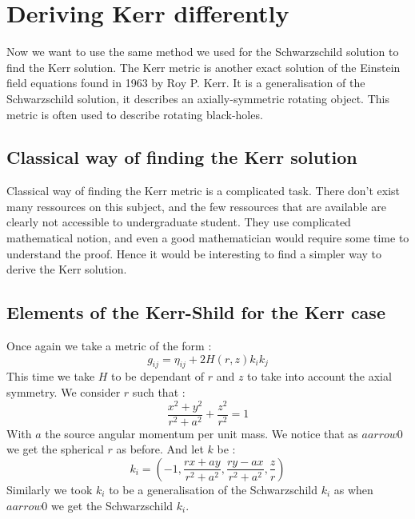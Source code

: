 \documentclass[a4paper,12pt]{article}
\theoremstyle{definition}
\begin{document}
\section{Deriving Kerr differently}
Now we want to use the same method we used for the Schwarzschild solution to find the Kerr solution.
The Kerr metric is another exact solution of the Einstein field equations found in 1963 by Roy P. Kerr.
It is a generalisation of the Schwarzschild solution, it describes an axially-symmetric rotating object.
This metric is often used to describe rotating black-holes.\\
\subsection{Classical way of finding the Kerr solution}
Classical way of finding the Kerr metric is a complicated task.
There don't exist many ressources on this subject, and the few ressources that are available are clearly not accessible to undergraduate student.
They use complicated mathematical notion, and even a good mathematician would require some time to understand the proof.
Hence it would be interesting to find a simpler way to derive the Kerr solution.
\subsection{Elements of the Kerr-Shild for the Kerr case}
Once again we take a metric of the form :
\begin{equation*}
	g_{ij}=\eta_{ij}+2H(r,z)k_ik_j
\end{equation*}
This time we take $H$ to be dependant of $r$ and $z$ to take into account the axial symmetry.
We consider $r$ such that :
\begin{equation*}
	\frac{x^2+y^2}{r^2+a^2}+\frac{z^2}{r^2}=1
\end{equation*}
With $a$ the source angular momentum per unit mass.
We notice that as $aarrow 0$ we get the spherical $r$ as before.
And let $k$ be :
\begin{equation*}
	k_i=(-1,\frac{r x + a y}{r^2 + a^2},\frac{ry-ax}{r^2+a^2},\frac{z}{r})
\end{equation*}
Similarly we took $k_i$ to be a generalisation of the Schwarzschild $k_i$ as when $aarrow 0$ we get the Schwarzschild $k_i$.
\end{document}
